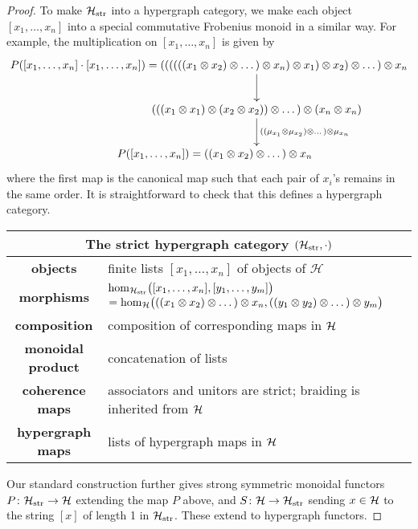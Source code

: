 \begin{proof}
  To make $\mathcal H_{\mathrm{str}}$ into a hypergraph category, we make each
  object $[x_1,\dots,x_n]$ into a special commutative Frobenius monoid in a
  similar way. For example, the multiplication on $[x_1,\dots,x_n]$ is given by 
  \[
    \xymatrixcolsep{-4pt}
    \xymatrix{
      P([x_1,\dots,x_n]\cdot[x_1,&\dots,x_n])=
      ((((((x_1 \ot x_2) \ot \dots) \ot x_n) \ot x_1) \ot x_2) \ot \dots) \ot
      x_n \ar[d] \\
      &(((x_1 \ot x_1) \ot (x_2 \ot x_2)) \ot \dots) \ot (x_n \ot x_n)
      \ar[d]^{((\mu_{x_1} \ot \mu_{x_2}) \ot \dots ) \ot \mu_{x_n}} \\
      &P([x_1,\dots,x_n])=((x_1 \ot x_2) \ot \dots ) \ot x_n 
      \phantom{P([x_1,\dots,x_n])=}
    }
  \]
  where the first map is the canonical map such that each pair of $x_i$'s remains
  in the same order. It is straightforward to check that this defines a
  hypergraph category.
  \begin{center}
    \begin{tabular}{| c | p{} |}
      \hline
      \multicolumn{2}{|c|}{The strict hypergraph category $(\mathcal H_{\mathrm{str}},
      \cdot)$} \\
      \hline
      \textbf{objects} & finite lists $[x_1, \dots, x_n]$ of objects of
      $\mathcal H$ \\ 
      \textbf{morphisms} & $\mathrm{hom}_{\mathcal H_{\mathrm{str}}}\big([x_1, \dots,
      x_n],[y_1, \dots, y_m]\big)$ \newline $= \mathrm{hom}_{\mathcal H}\big(((x_1 \otimes x_2) \otimes
      \dots) \otimes x_n, ((y_1 \otimes y_2) \otimes \dots) \otimes y_m\big)$\\ 
      \textbf{composition} & composition of corresponding maps in $\mathcal H$ \\
      \textbf{monoidal product} & concatenation of lists \\
      \textbf{coherence maps} & associators and unitors are strict; braiding is
      inherited from $\mathcal H$  \\
      \textbf{hypergraph maps} & lists of hypergraph maps in $\mathcal H$ \\
      \hline
    \end{tabular}
  \end{center}

  Our standard construction further gives strong symmetric monoidal functors
  $P{\colon} \mathcal H_{\mathrm{str}} \to \mathcal H$ extending the map $P$ above, and
  $S{\colon} \mathcal H \to \mathcal H_{\mathrm{str}}$ sending $x \in \mathcal H$ to the string
  $[x]$ of length 1 in $\mathcal H_{\mathrm{str}}$. These extend to hypergraph
  functors.


\end{proof}
